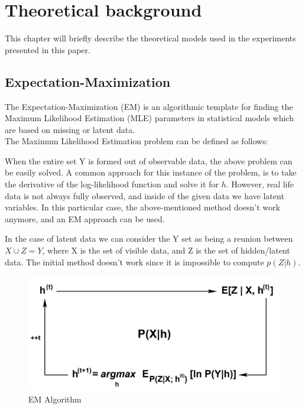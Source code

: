 \chapter{Theoretical background}
\label{TheoreticalBackground}

This chapter will briefly describe the theoretical models used in the experiments presented in this paper.

\section{Expectation-Maximization}
The Expectation-Maximization (EM) is an algorithmic template for finding the Maximum Likelihood Estimation (MLE) parameters in statistical models which are based on missing or latent data.\\
The Maximum Likelihood Estimation problem can be defined as follows:


 When the entire set Y is formed out of observable data, the above problem can be easily solved. A common approach for this instance of the problem, is to take the derivative of the log-likelihood function and solve it for $h$. However, real life data is not always fully observed, and inside of the given data we have latent variables. In this particular case, the above-mentioned method doesn't work anymore, and an EM approach can be used.
 
 In the case of latent data we can consider the Y set as being a reunion between $X \cup Z = Y$, where X is the set of visible data, and Z is the set of hidden/latent data. The initial method doesn't work since it is impossible to compute $p(Z | h)$.
 
 \begin{figure}[H]
 	\includegraphics[width=\textwidth]{Pictures/004EMScheme.png}
 	\caption{EM Algorithm \cite{emCiortuz}}
 	\label{EmScheme}
 \end{figure}
 
